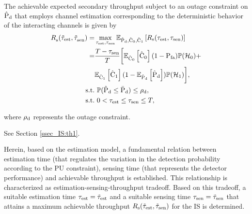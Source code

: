 \begin{theorem} \label{th_IS:th2}
\normalfont
The achievable expected secondary throughput subject to an outage constraint on $\hat{\text{P}}_{\text{d}}$ that employs channel estimation corresponding to the deterministic behavior of the interacting channels is given by  
\begin{align}
{R}_{\text{s}}^{\text{}}(\tilde{\tau}_{\text{est}}, \tilde{\tau}_{\text{sen}}^{\text{}}) =& \operatorname*{max}_{\tau_{\text{est}}, \tau_{\text{sen}}} {\mathbb E}_{\hat{\text{P}}_{\text{d}}, \hat{\text{C}}_{\text{0}}, \hat{\text{C}}_{\text{1}}}\left[ R_{\text{s}}(\tau_{\text{est}}, \tau_{\text{sen}}) \right] \nonumber \\ 
\quad =& \frac{T- \tau_{\text{sen}}}{T} \bigg[ {\mathbb E}_{\hat{\text{C}}_{\text{0}}}\left[ \hat{\text{C}}_{\text{0}} \right] (1 - \text{P}_{\text{fa}}) \mathbb P(\mathcal{H}_0) + \nonumber \\ \quad & {\mathbb E}_{\hat{\text{C}}_{\text{1}}}\left[ \hat{\text{C}}_{\text{1}} \right] (1 - {\mathbb E}_{\hat{\text{P}}_{\text{d}}}\left[ \hat{\text{P}}_{\text{d}} \right]) \mathbb P(\mathcal{H}_1)  \bigg], \label{eq_IS:thr_OC} \\
\text{s.t.} & \text{ }  \mathbb P(\hat{\text{P}}_{\text{d}} \le \bar{\text{P}}_{\text{d}}) \le \rho_{\text{d}}, \label{eq_IS:OC} \\
\text{s.t.} & \text{ }  0 < \tau_{\text{est}} \le \tau_{\text{sen}} \le T, \nonumber
\end{align}
\end{theorem} 
where $\rho_{\text{d}}$ represents the outage constraint. 

\begin{IEEEproof}[Solution] 
See Section \ref{ssec_IS:th1}.
\end{IEEEproof} 


\begin{remark} \label{rem_IS:rem1}
\normalfont
Herein, based on the estimation model, a fundamental relation between estimation time (that regulates the variation in the detection probability according to the PU constraint), sensing time (that represents the detector performance) and achievable throughput is established. This relationship is characterized as estimation-sensing-throughput tradeoff. Based on this tradeoff, a suitable estimation time $\tau_{\text{est}} = \tilde{\tau}_{\text{est}}$ and a suitable sensing time $\tau_{\text{sen}} = \tilde{\tau}_{\text{sen}}$ that attains a maximum achievable throughput $R_{\text{s}}(\tilde{\tau}_{\text{est}},\tilde{\tau}_{\text{sen}})$ for the IS is determined.  
\end{remark}

